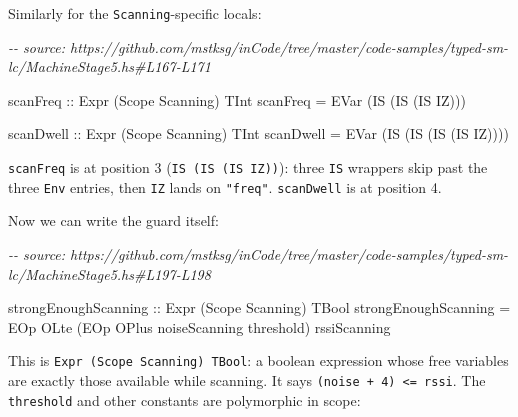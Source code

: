 \documentclass[]{article}
\newenvironment{Shaded}{}{}
\newcommand{\CommentTok}[1]{\textcolor[rgb]{0.38,0.63,0.69}{\textit{#1}}}
\newcommand{\DataTypeTok}[1]{\textcolor[rgb]{0.56,0.13,0.00}{#1}}
\newcommand{\NormalTok}[1]{#1}
\newcommand{\OtherTok}[1]{\textcolor[rgb]{0.00,0.44,0.13}{#1}}
\begin{document}
Similarly for the \texttt{Scanning}-specific locals:

\begin{Shaded}
\begin{Highlighting}[]
\CommentTok{{-}{-} source: https://github.com/mstksg/inCode/tree/master/code{-}samples/typed{-}sm{-}lc/MachineStage5.hs\#L167{-}L171}

\OtherTok{scanFreq ::} \DataTypeTok{Expr}\NormalTok{ (}\DataTypeTok{Scope} \DataTypeTok{Scanning}\NormalTok{) }\DataTypeTok{TInt}
\NormalTok{scanFreq }\OtherTok{=} \DataTypeTok{EVar}\NormalTok{ (}\DataTypeTok{IS}\NormalTok{ (}\DataTypeTok{IS}\NormalTok{ (}\DataTypeTok{IS} \DataTypeTok{IZ}\NormalTok{)))}

\OtherTok{scanDwell ::} \DataTypeTok{Expr}\NormalTok{ (}\DataTypeTok{Scope} \DataTypeTok{Scanning}\NormalTok{) }\DataTypeTok{TInt}
\NormalTok{scanDwell }\OtherTok{=} \DataTypeTok{EVar}\NormalTok{ (}\DataTypeTok{IS}\NormalTok{ (}\DataTypeTok{IS}\NormalTok{ (}\DataTypeTok{IS}\NormalTok{ (}\DataTypeTok{IS} \DataTypeTok{IZ}\NormalTok{))))}
\end{Highlighting}
\end{Shaded}

\texttt{scanFreq} is at position 3 (\texttt{IS\ (IS\ (IS\ IZ))}): three
\texttt{IS} wrappers skip past the three \texttt{Env} entries, then \texttt{IZ}
lands on \texttt{"freq"}. \texttt{scanDwell} is at position 4.

Now we can write the guard itself:

\begin{Shaded}
\begin{Highlighting}[]
\CommentTok{{-}{-} source: https://github.com/mstksg/inCode/tree/master/code{-}samples/typed{-}sm{-}lc/MachineStage5.hs\#L197{-}L198}

\OtherTok{strongEnoughScanning ::} \DataTypeTok{Expr}\NormalTok{ (}\DataTypeTok{Scope} \DataTypeTok{Scanning}\NormalTok{) }\DataTypeTok{TBool}
\NormalTok{strongEnoughScanning }\OtherTok{=} \DataTypeTok{EOp} \DataTypeTok{OLte}\NormalTok{ (}\DataTypeTok{EOp} \DataTypeTok{OPlus}\NormalTok{ noiseScanning threshold) rssiScanning}
\end{Highlighting}
\end{Shaded}

This is \texttt{Expr\ (Scope\ Scanning)\ TBool}: a boolean expression whose free
variables are exactly those available while scanning. It says
\texttt{(noise\ +\ 4)\ \textless{}=\ rssi}. The \texttt{threshold} and other
constants are polymorphic in scope:
\end{document}
